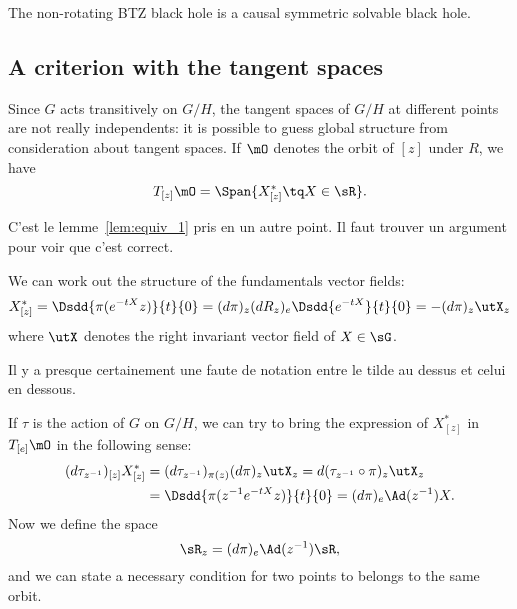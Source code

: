 \begin{corollary}
    The non-rotating BTZ black hole is a causal symmetric solvable black hole.
\end{corollary}

\subsection{A criterion with the tangent spaces}\label{subsec:R_z}

Since $G$ acts transitively on $G/H$, the tangent spaces of $G/H$ at different points are not really independents: it is possible to guess global structure from consideration about tangent spaces. If $\mO$ denotes the orbit of $[z]$ under $R$, we have
\[
   T_{[z]}\mO=\Span\{X^*_{[z]}\tq X\in\sR\}.
\]
\begin{probleme}
C'est le lemme~\ref{lem:equiv_1} pris en un autre point. Il faut trouver un argument pour voir que c'est correct.
\end{probleme}

We can work out the structure of the fundamentals vector fields:
 \begin{equation}
  X^*_{[z]}=\Dsdd{ \pi(e^{-tX}z) }{t}{0}
	   =(d\pi)_z(dR_z)_e\Dsdd{e^{-tX}}{t}{0}
	   =-(d\pi)_z\utX_z
\end{equation}
where $\utX$ denotes the right invariant vector field of $X\in\sG$.

\begin{probleme}
Il y a presque certainement une faute de notation entre le tilde au dessus et celui en dessous.
\end{probleme}

If $\tau$ is the action of $G$ on $G/H$, we can try to bring the expression of $X^*_{[z]}$ in $T_{[e]}\mO$ in the following sense:
\begin{equation}
\begin{split}
(d\tau_{z^{-1}})_{[z]}X^*_{[z]}&=(d\tau_{z^{-1}})_{\pi(z)}(d\pi)_z\utX_z
                              =d(\tau_{z^{-1}}\circ \pi)_z\utX_z\\
			      &=\Dsdd{ \pi( z^{-1} e^{-tX}z ) }{t}{0}
			      =(d\pi)_e\Ad(z^{-1})X.
\end{split}
\end{equation}
Now we define the space
\begin{equation}
\sR_z=(d\pi)_e\Ad(z^{-1})\sR,
\end{equation}
and we can state a necessary condition for two points to belongs to the same orbit.

